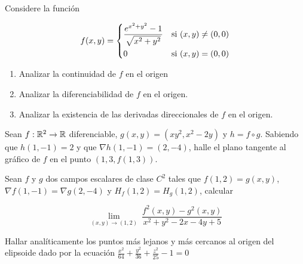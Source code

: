 
\begin{question}
    Considere la función

     \[
        f(x,y) =
        \begin{dcases}
            \frac{e^{x^{2}+y^{2}}-1}{\sqrt{x^{2}+y^{2}}} & \textnormal{si}\ (x,y) \neq (0,0) \\
            0                         & \textnormal{si}\ (x,y) = (0,0)
        \end{dcases}
    \]

    \begin{enumerate}
        \item Analizar la continuidad de $f$ en el origen
        \item Analizar la diferenciabilidad de $f$ en el origen.
        \item Analizar la existencia de las derivadas direccionales de $f$ en el origen.\\
    \end{enumerate}
\end{question}

\begin{question}
    Sean $f:\mathbb{R}^2\to\mathbb{R}$ diferenciable, $g(x,y)=(xy^2,x^2-2y)$ y $h=f\circ g$. Sabiendo que $h(1,-1) = 2$ y que $\nabla h(1,-1)=(2,-4)$, halle el plano tangente al gráfico de $f$ en el punto $(1,3,f(1,3))$.
\end{question}
\begin{question}
    Sean $f$ y $g$ dos campos escalares de clase $C^2$ tales que $f(1,2)=g(x,y)$, $\nabla f(1,-1)=\nabla g(2,-4)$ y $H_f(1,2)=H_g(1,2)$, calcular 
    
\[
        \lim_{(x,y)\to(1,2)} \
        \frac{f^2(x,y)-g^2(x,y)}{x^2+y^2-2x-4y+5}
    \]
\end{question}
\begin{question}
    Hallar analíticamente los puntos más lejanos y más cercanos al origen del elipsoide dado por la ecuación {\large$\frac{x^2}{64}+\frac{y^2}{36}+\frac{z^2}{25}-1=0$}
\end{question}
\newpage

